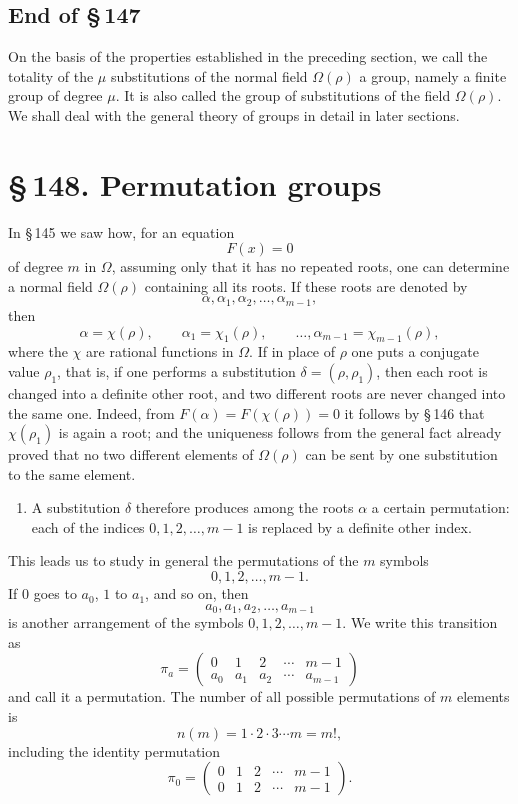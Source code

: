 \documentclass[11pt]{article}
\providecommand{\sect}[2]{\section*{\S\,#1. #2}}
\providecommand{\perm}[2]{\begin{pmatrix}#1\\#2\end{pmatrix}}
\begin{document}
\subsection*{End of \S\,147}

On the basis of the properties established in the preceding section, we call the totality of the $\mu$ substitutions of the normal field $\Omega(\rho)$ a group, namely a finite group of degree $\mu$. It is also called the group of substitutions of the field $\Omega(\rho)$. We shall deal with the general theory of groups in detail in later sections.

\sect{148}{Permutation groups}

In \S\,145 we saw how, for an equation
\[
        F(x)=0
\tag{1}
\]
of degree $m$ in $\Omega$, assuming only that it has no repeated roots, one can determine a normal field $\Omega(\rho)$ containing all its roots. If these roots are denoted by
\[
        \alpha,\alpha_1,\alpha_2,
\ldots,
\alpha_{m-1},
\tag{2}
\]
then
\[
        \alpha=\chi(\rho),\qquad
        \alpha_1=\chi_1(\rho),\qquad \ldots,
        \alpha_{m-1}=\chi_{m-1}(\rho),
\tag{3}
\]
where the $\chi$ are rational functions in $\Omega$. If in place of $\rho$ one puts a conjugate value $\rho_1$, that is, if one performs a substitution $\delta=(\rho,\rho_1)$, then each root is changed into a definite other root, and two different roots are never changed into the same one. Indeed, from $F(\alpha)=F(\chi(\rho))=0$ it follows by \S\,146 that $\chi(\rho_1)$ is again a root; and the uniqueness follows from the general fact already proved that no two different elements of $\Omega(\rho)$ can be sent by one substitution to the same element.

\begin{enumerate}[label=\arabic*.,leftmargin=2em]
\item A substitution $\delta$ therefore produces among the roots $\alpha$ a certain permutation: each of the indices $0,1,2,\ldots,m-1$ is replaced by a definite other index.
\end{enumerate}

This leads us to study in general the permutations of the $m$ symbols
\[
        0,1,2,
\ldots,m-1.
\]
If $0$ goes to $a_0$, $1$ to $a_1$, and so on, then
\[
        a_0,a_1,a_2,
\ldots,a_{m-1}
\tag{4}
\]
is another arrangement of the symbols $0,1,2,
\ldots,m-1$. We write this transition as
\[
        \pi_a=\perm{0&1&2&\cdots&m-1}{a_0&a_1&a_2&\cdots&a_{m-1}}
\tag{5}
\]
and call it a permutation. The number of all possible permutations of $m$ elements is
\[
        n(m)=1\cdot2\cdot3\cdots m=m!,
\]
including the identity permutation
\[
        \pi_0=\perm{0&1&2&\cdots&m-1}{0&1&2&\cdots&m-1}.
\]
\end{document}
